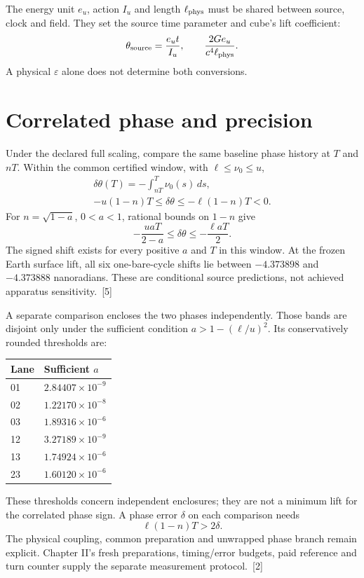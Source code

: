 \documentclass[10pt,twocolumn,letterpaper]{article}
\begin{document}
The energy unit $e_u$, action $I_u$ and length $\ell_{\rm phys}$ must be shared between source, clock and field. They set the source time parameter and cube's lift coefficient:
\[
\theta_{\rm source}=\frac{e_ut}{I_u},\qquad\frac{2Ge_u}{c^4\ell_{\rm phys}}.
\]
A physical $\varepsilon$ alone does not determine both conversions.

\section{Correlated phase and precision}
Under the declared full scaling, compare the same baseline phase history at $T$ and $nT$. Within the common certified window, with $\ell\leq\nu_0\leq u$,
\[
\begin{gathered}
\delta\theta(T)=-\int_{nT}^T\nu_0(s)\,ds,\\
-u(1-n)T\leq\delta\theta\leq-\ell(1-n)T<0.
\end{gathered}
\]
For $n=\sqrt{1-a}$, $0<a<1$, rational bounds on $1-n$ give
\[
-\frac{uaT}{2-a}\leq\delta\theta\leq-\frac{\ell aT}{2}.
\]
The signed shift exists for every positive $a$ and $T$ in this window. At the frozen Earth surface lift, all six one-bare-cycle shifts lie between $-4.373898$ and $-4.373888$ nanoradians. These are conditional source predictions, not achieved apparatus sensitivity.~[5]

A separate comparison encloses the two phases independently. Those bands are disjoint only under the sufficient condition $a>1-(\ell/u)^2$. Its conservatively rounded thresholds are:
\begin{center}
\small\begin{tabular}{@{}ll@{}}\toprule
Lane & Sufficient $a$\\\midrule
01 & $2.84407\times10^{-9}$\\
02 & $1.22170\times10^{-8}$\\
03 & $1.89316\times10^{-6}$\\
12 & $3.27189\times10^{-9}$\\
13 & $1.74924\times10^{-6}$\\
23 & $1.60120\times10^{-6}$\\\bottomrule
\end{tabular}
\end{center}
These thresholds concern independent enclosures; they are not a minimum lift for the correlated phase sign. A phase error $\delta$ on each comparison needs
\[
\ell(1-n)T>2\delta.
\]
The physical coupling, common preparation and unwrapped phase branch remain explicit. Chapter II's fresh preparations, timing/error budgets, paid reference and turn counter supply the separate measurement protocol.~[2]
\end{document}
